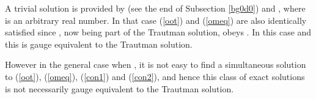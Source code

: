 \documentclass[a4paper,twocolumn,prd,showpacs,amsmath,amssymb]{revtex4}
\begin{document}
A trivial solution is provided by \coordHE{}
(see the end of Subsection \ref{bg0d0}) and \coordHE{}, where \coordHE{} is an arbitrary
real number. In that case (\ref{oot}) and (\ref{omeq}) are also identically
satisfied since \coordHE{}, now being part of the Trautman solution, obeys
\coordHE{}. In this case \coordHE{} and
this is gauge equivalent to the Trautman solution.

However in the general case when \coordHE{}, it is not easy to find
a simultaneous solution to (\ref{oot}), (\ref{omeq}), (\ref{con1}) and (\ref{con2}),
and hence this class of exact solutions is not necessarily gauge equivalent to the
Trautman solution.

\subsection{\label{gg0d0} \coordHE{}}
\end{document}
